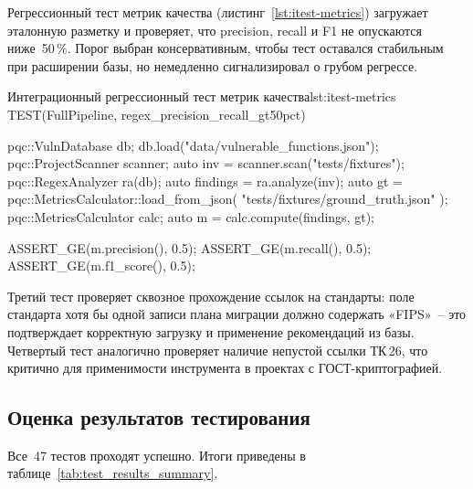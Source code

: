 \documentclass{itmo-vkr}
\begin{document}
Регрессионный тест метрик качества (листинг~\ref{lst:itest-metrics})
загружает эталонную разметку и проверяет, что \textenglish{precision},
\textenglish{recall} и F1 не опускаются ниже~50\,\%.
Порог выбран консервативным, чтобы тест оставался стабильным
при расширении базы, но немедленно сигнализировал о грубом
регрессе.

\begin{itmolisting}[C++]{Интеграционный регрессионный тест метрик качества}{lst:itest-metrics}
TEST(FullPipeline, regex_precision_recall_gt50pct) {
    pqc::VulnDatabase db;
    db.load("data/vulnerable_functions.json");
    pqc::ProjectScanner scanner;
    auto inv = scanner.scan("tests/fixtures");
    pqc::RegexAnalyzer ra(db);
    auto findings = ra.analyze(inv);
    auto gt = pqc::MetricsCalculator::load_from_json(
        "tests/fixtures/ground_truth.json"
    );
    pqc::MetricsCalculator calc;
    auto m = calc.compute(findings, gt);

    ASSERT_GE(m.precision(), 0.5);
    ASSERT_GE(m.recall(),    0.5);
    ASSERT_GE(m.f1_score(),  0.5);
}
\end{itmolisting}

Третий тест проверяет сквозное прохождение ссылок на стандарты:
поле стандарта хотя бы одной записи плана миграции должно содержать
«FIPS»~-- это подтверждает корректную загрузку и применение
рекомендаций из базы.
Четвертый тест аналогично проверяет наличие непустой ссылки ТК\,26,
что критично для применимости инструмента в проектах с
ГОСТ-криптографией.

\subsection{Оценка результатов тестирования}

Все~47 тестов проходят успешно.
Итоги приведены в таблице~\ref{tab:test_results_summary}.
\end{document}
